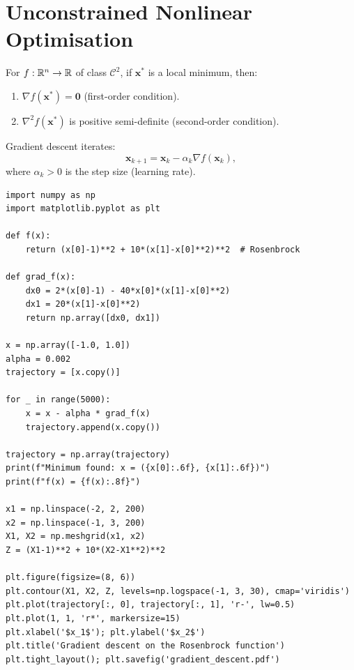 \section{Unconstrained Nonlinear Optimisation}
\label{sec:unconstrained}

\begin{definition}
For $f:\mathbb{R}^n\to\mathbb{R}$ of class $\mathcal{C}^2$, if $\mathbf{x}^*$ is a
local minimum, then:
\begin{enumerate}
  \item $\nabla f(\mathbf{x}^*) = \mathbf{0}$ (first-order condition).
  \item $\nabla^2 f(\mathbf{x}^*)$ is positive semi-definite
    (second-order condition).
\end{enumerate}
\end{definition}

\begin{definition}
Gradient descent iterates:
\[
  \mathbf{x}_{k+1} = \mathbf{x}_k - \alpha_k\nabla f(\mathbf{x}_k),
\]
where $\alpha_k>0$ is the step size (learning rate).
\end{definition}

\begin{codeblock}[title=\textbf{Gradient descent in Python}]
\begin{verbatim}
import numpy as np
import matplotlib.pyplot as plt

def f(x):
    return (x[0]-1)**2 + 10*(x[1]-x[0]**2)**2  # Rosenbrock

def grad_f(x):
    dx0 = 2*(x[0]-1) - 40*x[0]*(x[1]-x[0]**2)
    dx1 = 20*(x[1]-x[0]**2)
    return np.array([dx0, dx1])

x = np.array([-1.0, 1.0])
alpha = 0.002
trajectory = [x.copy()]

for _ in range(5000):
    x = x - alpha * grad_f(x)
    trajectory.append(x.copy())

trajectory = np.array(trajectory)
print(f"Minimum found: x = ({x[0]:.6f}, {x[1]:.6f})")
print(f"f(x) = {f(x):.8f}")

x1 = np.linspace(-2, 2, 200)
x2 = np.linspace(-1, 3, 200)
X1, X2 = np.meshgrid(x1, x2)
Z = (X1-1)**2 + 10*(X2-X1**2)**2

plt.figure(figsize=(8, 6))
plt.contour(X1, X2, Z, levels=np.logspace(-1, 3, 30), cmap='viridis')
plt.plot(trajectory[:, 0], trajectory[:, 1], 'r-', lw=0.5)
plt.plot(1, 1, 'r*', markersize=15)
plt.xlabel('$x_1$'); plt.ylabel('$x_2$')
plt.title('Gradient descent on the Rosenbrock function')
plt.tight_layout(); plt.savefig('gradient_descent.pdf')
\end{verbatim}
\end{codeblock}


